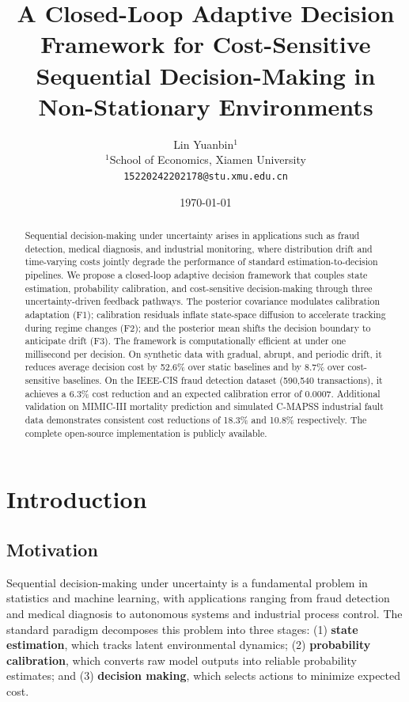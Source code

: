 \documentclass[12pt,a4paper]{article}
\title{A Closed-Loop Adaptive Decision Framework for Cost-Sensitive Sequential Decision-Making in Non-Stationary Environments}
\author{Lin Yuanbin$^{1}$ \\
$^{1}$School of Economics, Xiamen University\\
\texttt{15220242202178@stu.xmu.edu.cn}}
\date{\today}
\begin{document}
\maketitle

\begin{abstract}Sequential decision-making under uncertainty arises in applications such as fraud detection, medical diagnosis, and industrial monitoring, where distribution drift and time-varying costs jointly degrade the performance of standard estimation-to-decision pipelines. We propose a closed-loop adaptive decision framework that couples state estimation, probability calibration, and cost-sensitive decision-making through three uncertainty-driven feedback pathways. The posterior covariance modulates calibration adaptation (F1); calibration residuals inflate state-space diffusion to accelerate tracking during regime changes (F2); and the posterior mean shifts the decision boundary to anticipate drift (F3). The framework is computationally efficient at under one millisecond per decision. On synthetic data with gradual, abrupt, and periodic drift, it reduces average decision cost by 52.6\% over static baselines and by 8.7\% over cost-sensitive baselines. On the IEEE-CIS fraud detection dataset (590,540 transactions), it achieves a 6.3\% cost reduction and an expected calibration error of 0.0007. Additional validation on MIMIC-III mortality prediction and simulated C-MAPSS industrial fault data demonstrates consistent cost reductions of 18.3\% and 10.8\% respectively. The complete open-source implementation is publicly available.\end{abstract}

\section{Introduction}

\subsection{Motivation}

Sequential decision-making under uncertainty is a fundamental problem in statistics and machine learning, with applications ranging from fraud detection and medical diagnosis to autonomous systems and industrial process control. The standard paradigm decomposes this problem into three stages: (1) \textbf{state estimation}, which tracks latent environmental dynamics; (2) \textbf{probability calibration}, which converts raw model outputs into reliable probability estimates; and (3) \textbf{decision making}, which selects actions to minimize expected cost.
\end{document}
